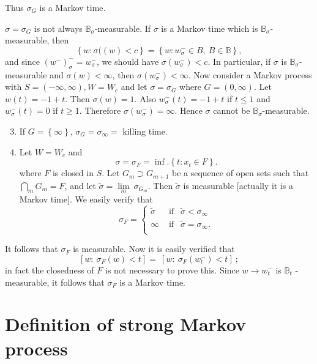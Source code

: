 Thus $\sigma_G$ is a Markov time.
\begin{remark*}
  $\sigma = \sigma_G$ is not always
  $\mathbb{B}_{\sigma}$-measurable. If $\sigma$ is a Markov time which
  is 
  $\mathbb{B}_{\sigma}$-measurable, then  
  $$
  \left \{ w : \sigma ((w) < c \right \} = \left \{ w : w^-_\sigma \in
  B, ~ B \in \mathbb{B} \right \}, 
  $$
  and since $(w^-)^{-}_\sigma=w^-_\sigma$, we should have
  $\sigma (w^-_\sigma) < c$. In particular, if $\sigma$ is
  $\mathbb{B}_{\sigma}$-measurable and $\sigma (w) < \infty$, then
  $\sigma (w^-_\sigma) < \infty$. Now consider a Markov process with
  $S = ( - \infty, \infty ), W = W_c$ and let $\sigma = \sigma_G$
  where $G = (0, \infty)$. Let $w (t) = -1 + t$. Then $\sigma (w) =
  1$. Also $w^-_\sigma (t) = - 1 + t$ if $t \leq 1$ and $w^-_\sigma
  (t) = 0$ if $t \ge 1$. Therefore  $\sigma (w^-_\sigma) =
  \infty$. Hence $\sigma$ cannot be $\mathbb{B}_{\sigma}$-measurable.  
  \begin{enumerate}
\setcounter{enumi}{2}
  \item If $G = \left\{ \infty \right\}$, $\sigma_G = \sigma_\infty
    = $ killing time. 
  \item Let $W = W_c$ and 
    $$
    \sigma = \sigma_F = \inf. \left \{ t : x_t \in F \right \}.
    $$\pageoriginale
    where $F$ is closed in $S$. Let $G_m \supset G_{m+1}$ be a
    sequence of open sets such that $\bigcap\limits_{m} G_m = F$, and
    let $\tilde{\sigma} = \lim \limits_{m} ~ \sigma_{G_{m}}$. Then
    $\tilde{\sigma}$ is  measurable [actually it is a Markov time]. We
    easily verify that   
    $$
    \sigma_F =
    \begin{cases}
      \tilde{\sigma} &\text{ if } ~~\tilde{\sigma} < \sigma_\infty \\
      \infty &\text{ if } ~~\tilde{\sigma} = \sigma_\infty .\\
    \end{cases}
    $$
  \end{enumerate}
\end{remark*}

It follows that $\sigma_F$ is measurable. Now it is easily verified that 
$$
\left [ w : ~ \sigma_F (w) < t \right ] = ~ \left [ w : ~ \sigma_F
  (w^-_t) < t \right ]~ ; 
$$
in fact the  closedness of $F$ is not necessary to prove this. Since
$w \to w^-_t$ is $\mathbb{B}_{t}$ -measurable, it follows that
$\sigma_F$ is a Markov time. 

\section{Definition of strong Markov process}\label{chap2-sec3}

